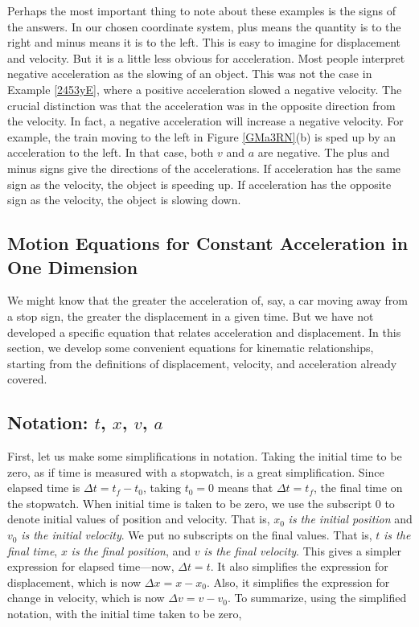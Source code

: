 \documentclass[main-ap-physics.tex]{subfiles}
\begin{document}
Perhaps the most important thing to note about these examples is the signs of the answers. In our chosen coordinate system, plus means the quantity is to the right and minus means it is to the left. This is easy to imagine for displacement and velocity. But it is a little less obvious for acceleration. Most people interpret negative acceleration as the slowing of an object. This was not the case in Example \ref{2453yE}, where a positive acceleration slowed a negative velocity. The crucial distinction was that the acceleration was in the opposite direction from the velocity. In fact, a negative acceleration will increase a negative velocity. For example, the train moving to the left in Figure \ref{GMa3RN}(b) is sped up by an acceleration to the left. In that case, both $v$ and $a$ are negative. The plus and minus signs give the directions of the accelerations. If acceleration has the same sign as the velocity, the object is speeding up. If acceleration has the opposite sign as the velocity, the object is slowing down.

\subsection{Motion Equations for Constant Acceleration in One Dimension} \label{WbwyTy}

We might know that the greater the acceleration of, say, a car moving away from a stop sign, the greater the displacement in a given time. But we have not developed a specific equation that relates acceleration and displacement. In this section, we develop some convenient equations for kinematic relationships, starting from the definitions of displacement, velocity, and acceleration already covered.

\subsection*{Notation: $t$, $x$, $v$, $a$}

First, let us make some simplifications in notation. Taking the initial time to be zero, as if time is measured with a stopwatch, is a great simplification. Since elapsed time is $\Delta t = t_f - t_0$, taking $t_0 = 0$ means that $\Delta t = t_f$, the final time on the stopwatch. When initial time is taken to be zero, we use the subscript 0 to denote initial values of position and velocity. That is, $x_0$ \textit{is the initial position} and $v_0$ \textit{is the initial velocity}. We put no subscripts on the final values. That is, $t$ \textit{is the final time}, $x$ \textit{is the final position}, and $v$ \textit{is the final velocity}. This gives a simpler expression for elapsed time---now, $\Delta t = t$. It also simplifies the expression for displacement, which is now $\Delta x = x - x_0$. Also, it simplifies the expression for change in velocity, which is now $\Delta v = v - v_0$. To summarize, using the simplified notation, with the initial time taken to be zero,
\end{document}
